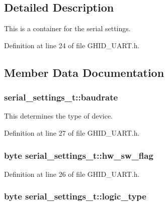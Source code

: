 \subsection{\-Detailed \-Description}
\-This is a container for the serial settings. 

\-Definition at line 24 of file \-G\-H\-I\-D\-\_\-\-U\-A\-R\-T.\-h.



\subsection{\-Member \-Data \-Documentation}
\hypertarget{structserial__settings__t_a7bc4206000da0dbac55b20e32e9acb2c}{
\subsubsection[{baudrate}]{ {\bf serial\-\_\-settings\-\_\-t\-::baudrate}}}\label{structserial__settings__t_a7bc4206000da0dbac55b20e32e9acb2c}


\-This determines the type of device. 



\-Definition at line 27 of file \-G\-H\-I\-D\-\_\-\-U\-A\-R\-T.\-h.

\hypertarget{structserial__settings__t_afcf0421e61f47f50a3498b2efc66f29c}{
\subsubsection[{hw\-\_\-sw\-\_\-flag}]{\setlength{\rightskip}{0pt plus 5cm}byte {\bf serial\-\_\-settings\-\_\-t\-::hw\-\_\-sw\-\_\-flag}}}\label{structserial__settings__t_afcf0421e61f47f50a3498b2efc66f29c}


\-Definition at line 26 of file \-G\-H\-I\-D\-\_\-\-U\-A\-R\-T.\-h.

\hypertarget{structserial__settings__t_ad5f8e5f4b2a37dac1c7abbf92edfd593}{
\subsubsection[{logic\-\_\-type}]{\setlength{\rightskip}{0pt plus 5cm}byte {\bf serial\-\_\-settings\-\_\-t\-::logic\-\_\-type}}}\label{structserial__settings__t_ad5f8e5f4b2a37dac1c7abbf92edfd593}


